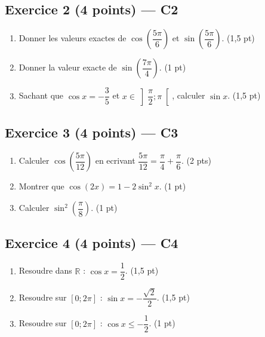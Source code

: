 \subsection*{Exercice 2 \hfill (4 points) — C2}

\begin{enumerate}
  \item Donner les valeurs exactes de $\cos\!\left(\dfrac{5\pi}{6}\right)$ et $\sin\!\left(\dfrac{5\pi}{6}\right)$. \hfill (1,5 pt)
  \item Donner la valeur exacte de $\sin\!\left(\dfrac{7\pi}{4}\right)$. \hfill (1 pt)
  \item Sachant que $\cos x = -\dfrac{3}{5}$ et $x \in \left]\dfrac{\pi}{2};\pi\right[$, calculer $\sin x$. \hfill (1,5 pt)
\end{enumerate}

\subsection*{Exercice 3 \hfill (4 points) — C3}

\begin{enumerate}
  \item Calculer $\cos\!\left(\dfrac{5\pi}{12}\right)$ en ecrivant $\dfrac{5\pi}{12} = \dfrac{\pi}{4} + \dfrac{\pi}{6}$. \hfill (2 pts)
  \item Montrer que $\cos(2x) = 1 - 2\sin^2 x$. \hfill (1 pt)
  \item Calculer $\sin^2\!\left(\dfrac{\pi}{8}\right)$. \hfill (1 pt)
\end{enumerate}

\subsection*{Exercice 4 \hfill (4 points) — C4}

\begin{enumerate}
  \item Resoudre dans $\mathbb{R}$ : $\cos x = \dfrac{1}{2}$. \hfill (1,5 pt)
  \item Resoudre sur $[0;2\pi]$ : $\sin x = -\dfrac{\sqrt{2}}{2}$. \hfill (1,5 pt)
  \item Resoudre sur $[0;2\pi]$ : $\cos x \leqslant -\dfrac{1}{2}$. \hfill (1 pt)
\end{enumerate}

